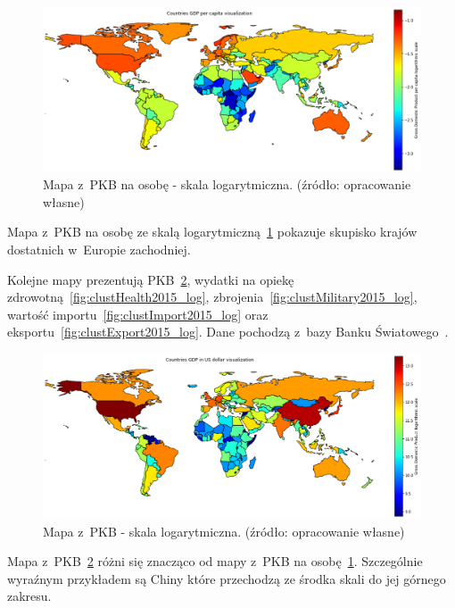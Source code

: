 \documentclass[11pt]{report}
\begin{document}
    \begin{figure}[!htp]
        \centering
        \includegraphics[width=\linewidth]{fig/CLUST/gdp_log.png}
        \caption{Mapa z~PKB na osobę - skala logarytmiczna. (źródło: opracowanie własne)}
        \label{fig:clustGDP_log}
    \end{figure}
    Mapa z~PKB na osobę ze skalą logarytmiczną~\ref{fig:clustGDP_log} pokazuje skupisko krajów dostatnich w~Europie zachodniej.

    Kolejne mapy prezentują PKB~\ref{fig:clustGDP2015_log}, wydatki na opiekę zdrowotną~\ref{fig:clustHealth2015_log}, zbrojenia~\ref{fig:clustMilitary2015_log}, wartość importu~\ref{fig:clustImport2015_log} oraz eksportu~\ref{fig:clustExport2015_log}.
    Dane pochodzą z~bazy Banku Światowego~\cite{worldbank}.

    \begin{figure}[!htp]
        \centering
        \includegraphics[width=\linewidth]{fig/CLUST/gdp2015.png}
        \caption{Mapa z~PKB - skala logarytmiczna. (źródło: opracowanie własne)}
        \label{fig:clustGDP2015_log}
    \end{figure}
    Mapa z~PKB~\ref{fig:clustGDP2015_log} różni się znacząco od mapy z~PKB na osobę~\ref{fig:clustGDP_log}.
    Szczególnie wyraźnym przykładem są Chiny które przechodzą ze środka skali do jej górnego zakresu.
\end{document}
